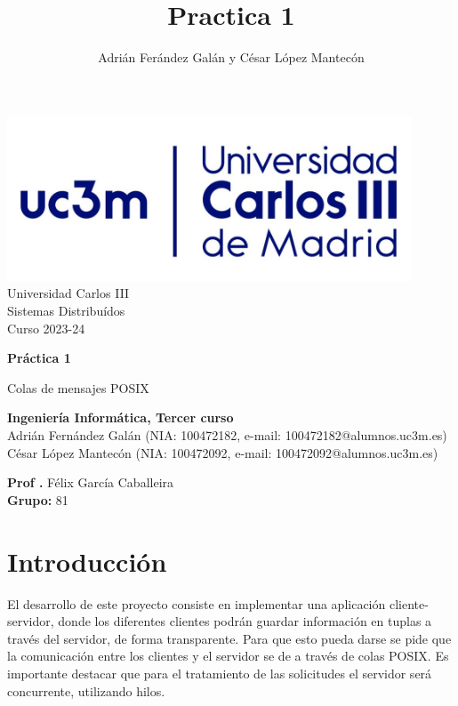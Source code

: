 \documentclass[]{article}
\title{Practica 1}
\author{Adrián Ferández Galán y César López Mantecón}
\begin{document}
\begin{titlepage}
    \centering
   \includegraphics[width=0.9\textwidth]{uc3m.jpg} 
    {\Huge Universidad Carlos III\\
    
     \Large Sistemas Distribuídos\\
     \vspace{0.5cm}
     Curso 2023-24}
    \vspace{2cm}

    {\Huge \textbf{Práctica 1} \par}
    \vspace{0.5cm}
    {\Large Colas de mensajes POSIX \par}
    \vspace{8cm}

   \textbf{Ingeniería Informática, Tercer curso}\\
    \vspace{0.2cm} 
    Adrián Fernández Galán (NIA: 100472182, e-mail: 100472182@alumnos.uc3m.es) \\
    César López Mantecón   (NIA: 100472092, e-mail: 100472092@alumnos.uc3m.es)
    \vspace{0.5cm}

   
    \textbf{Prof .} Félix García Caballeira\\
    \textbf{Grupo: } 81   
    
\end{titlepage}
\newpage

\renewcommand{\contentsname}{\centering Índice}
\tableofcontents

\newpage
\section{Introducción}
\label{sec:introduccion}
El desarrollo de este proyecto consiste en implementar una aplicación cliente-servidor, donde los diferentes clientes podrán guardar información en tuplas a través del servidor, de forma transparente.
Para que esto pueda darse se pide que la comunicación entre los clientes y el servidor se de a través de colas POSIX.
Es importante destacar que para el tratamiento de las solicitudes el servidor será concurrente, utilizando hilos.
\end{document}
